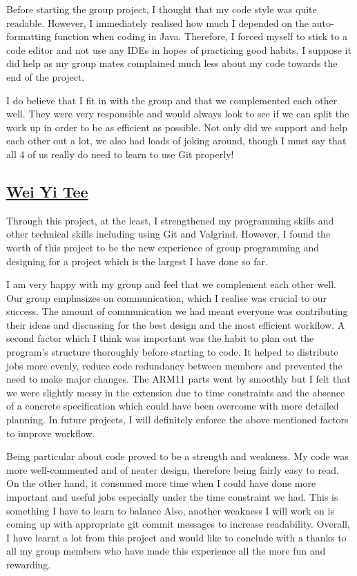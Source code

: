 \documentclass[11pt]{article}
\begin{document}
Before starting the group project, I thought that my code style was quite readable. However, I immediately realised how much I depended on the auto-formatting function when coding in Java. Therefore, I forced myself to stick to a code editor and not use any IDEs in hopes of practicing good habits. I suppose it did help as my group mates complained much less about my code towards the end of the project. 

I do believe that I fit in with the group and that we complemented each other well. They were very responsible and would always look to see if we can split the work up in order to be as efficient as possible. Not only did we support and help each other out a lot, we also had loads of joking around, though I must say that all 4 of us really do need to learn to use Git properly!

\subsection*{\underline{Wei Yi Tee}}
Through this project, at the least, I strengthened my programming skills  and other technical skills including using Git and Valgrind. However, I found the worth of this project to be the new experience of group programming and designing for a project which is the largest I have done so far. 

I am very happy with my group and feel that we complement each other well. Our group emphasizes on communication, which I realise was crucial to our success. The amount of communication we had meant everyone was contributing their ideas and discussing for the best design and the most efficient workflow. A second factor which I think was important was the habit to plan out the program's structure thoroughly before starting to code. It helped to distribute jobs more evenly, reduce code redundancy between members and prevented the need to make major changes. The ARM11 parts went by smoothly but I felt that we were slightly messy in the extension due to time constraints and the absence of a concrete specification which could have been overcome with more detailed planning. In future projects, I will definitely enforce the above mentioned factors to improve workflow.

Being particular about code proved to be a strength and weakness. My code was more well-commented and of neater design, therefore being fairly easy to read. On the other hand, it consumed more time when I could have done more important and useful jobs especially under the time constraint we had. This is something I have to learn to balance Also, another weakness I will work on is coming up with appropriate git commit messages to increase readability. Overall, I have learnt a lot from this project and would like to conclude with a thanks to all my group members who have made this experience all the more fun and rewarding. 
\newpage
\end{document}
